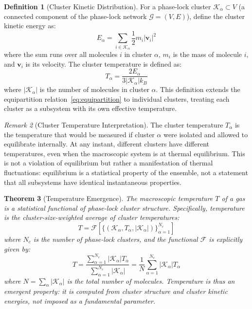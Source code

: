 \documentclass[12pt,a4paper]{article}
\newtheorem{theorem}{Theorem}[section]
\theoremstyle{definition}
\newtheorem{definition}[theorem]{Definition}
\theoremstyle{remark}
\newtheorem{remark}[theorem]{Remark}
\newcommand{\phaselockgraph}{\mathcal{G}}
\begin{document}
\begin{definition}[Cluster Kinetic Distribution]
\label{def:cluster_kinetic}
For a phase-lock cluster $\mathcal{K}_\alpha \subset V$ (a connected component of the phase-lock network $\phaselockgraph = (V,E)$), define the cluster kinetic energy as:
\begin{equation}
E_{\alpha} = \sum_{i \in \mathcal{K}_\alpha} \frac{1}{2} m_i |\mathbf{v}_i|^2
\end{equation}
where the sum runs over all molecules $i$ in cluster $\alpha$, $m_i$ is the mass of molecule $i$, and $\mathbf{v}_i$ is its velocity. The cluster temperature is defined as:
\begin{equation}
T_\alpha = \frac{2 E_\alpha}{3 |\mathcal{K}_\alpha| k_B}
\end{equation}
where $|\mathcal{K}_\alpha|$ is the number of molecules in cluster $\alpha$. This definition extends the equipartition relation~\eqref{eq:equipartition} to individual clusters, treating each cluster as a subsystem with its own effective temperature.
\end{definition}

\begin{remark}[Cluster Temperature Interpretation]
\label{rem:cluster_temperature}
The cluster temperature $T_\alpha$ is the temperature that would be measured if cluster $\alpha$ were isolated and allowed to equilibrate internally. At any instant, different clusters have different temperatures, even when the macroscopic system is at thermal equilibrium. This is not a violation of equilibrium but rather a manifestation of thermal fluctuations: equilibrium is a statistical property of the ensemble, not a statement that all subsystems have identical instantaneous properties.
\end{remark}

\begin{theorem}[Temperature Emergence]
\label{thm:temperature_emergence}
The macroscopic temperature $T$ of a gas is a statistical functional of phase-lock cluster structure. Specifically, temperature is the cluster-size-weighted average of cluster temperatures:
\begin{equation}
T = \mathcal{F}[\{(\mathcal{K}_\alpha, T_\alpha, |\mathcal{K}_\alpha|)\}_{\alpha=1}^{N_c}]
\label{eq:temperature_functional}
\end{equation}
where $N_c$ is the number of phase-lock clusters, and the functional $\mathcal{F}$ is explicitly given by:
\begin{equation}
T = \frac{\sum_{\alpha=1}^{N_c} |\mathcal{K}_\alpha| T_\alpha}{\sum_{\alpha=1}^{N_c} |\mathcal{K}_\alpha|} = \frac{1}{N}\sum_{\alpha=1}^{N_c} |\mathcal{K}_\alpha| T_\alpha
\label{eq:temperature_average}
\end{equation}
where $N = \sum_{\alpha} |\mathcal{K}_\alpha|$ is the total number of molecules. Temperature is thus an emergent property: it is computed from cluster structure and cluster kinetic energies, not imposed as a fundamental parameter.
\end{theorem}
\end{document}
